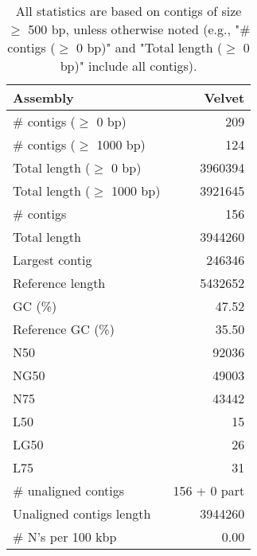 \documentclass[12pt,a4paper]{article}
\begin{document}
\begin{table}[ht]
\begin{center}
\caption{All statistics are based on contigs of size $\geq$ 500 bp, unless otherwise noted (e.g., "\# contigs ($\geq$ 0 bp)" and "Total length ($\geq$ 0 bp)" include all contigs).}
\begin{tabular}{|l*{1}{|r}|}
\hline
Assembly & Velvet \\ \hline
\# contigs ($\geq$ 0 bp) & 209 \\ \hline
\# contigs ($\geq$ 1000 bp) & 124 \\ \hline
Total length ($\geq$ 0 bp) & 3960394 \\ \hline
Total length ($\geq$ 1000 bp) & 3921645 \\ \hline
\# contigs & 156 \\ \hline
Total length & 3944260 \\ \hline
Largest contig & 246346 \\ \hline
Reference length & 5432652 \\ \hline
GC (\%) & 47.52 \\ \hline
Reference GC (\%) & 35.50 \\ \hline
N50 & 92036 \\ \hline
NG50 & 49003 \\ \hline
N75 & 43442 \\ \hline
L50 & 15 \\ \hline
LG50 & 26 \\ \hline
L75 & 31 \\ \hline
\# unaligned contigs & 156 + 0 part \\ \hline
Unaligned contigs length & 3944260 \\ \hline
\# N's per 100 kbp & 0.00 \\ \hline
\end{tabular}
\end{center}
\end{table}
\end{document}
